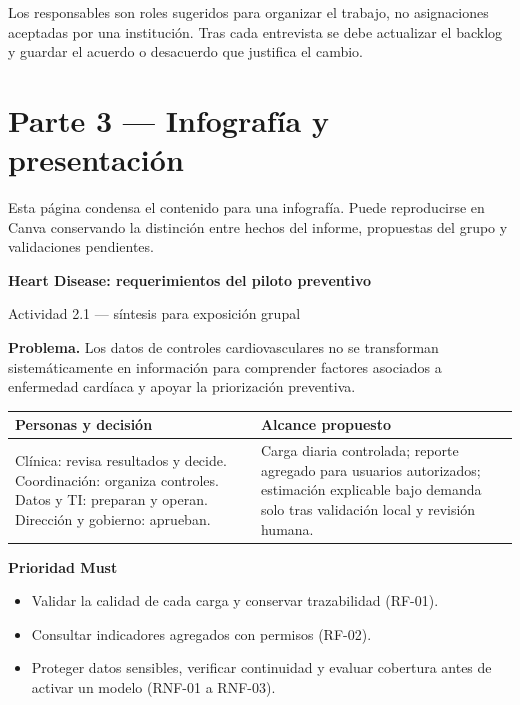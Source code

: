 \documentclass[12pt,a4paper]{article}
\begin{document}
Los responsables son roles sugeridos para organizar el trabajo, no asignaciones aceptadas por una institución. Tras cada entrevista se debe actualizar el backlog y guardar el acuerdo o desacuerdo que justifica el cambio.

\clearpage
\section{Parte 3 --- Infografía y presentación}

Esta página condensa el contenido para una infografía. Puede reproducirse en Canva conservando la distinción entre hechos del informe, propuestas del grupo y validaciones pendientes.

\begingroup\small
\begin{center}
  {\Large\bfseries Heart Disease: requerimientos del piloto preventivo\par}
  \vspace{0.4em}
  {\normalsize Actividad 2.1 --- síntesis para exposición grupal\par}
\end{center}

\vspace{0.5em}
\noindent\textbf{Problema.} Los datos de controles cardiovasculares no se transforman sistemáticamente en información para comprender factores asociados a enfermedad cardíaca y apoyar la priorización preventiva.

\vspace{0.5em}
\begin{table}[H]
  \centering
  \small
  \begin{tabularx}{\textwidth}{@{}XX@{}}
    \toprule
    Personas y decisión & Alcance propuesto \\
    \midrule
    Clínica: revisa resultados y decide. Coordinación: organiza controles. Datos y TI: preparan y operan. Dirección y gobierno: aprueban. & Carga diaria controlada; reporte agregado para usuarios autorizados; estimación explicable bajo demanda solo tras validación local y revisión humana. \\
    \bottomrule
  \end{tabularx}
\end{table}

\noindent\textbf{Prioridad Must}\par
\begin{itemize}
  \item Validar la calidad de cada carga y conservar trazabilidad (RF-01).
  \item Consultar indicadores agregados con permisos (RF-02).
  \item Proteger datos sensibles, verificar continuidad y evaluar cobertura antes de activar un modelo (RNF-01 a RNF-03).
\end{itemize}
\end{document}
